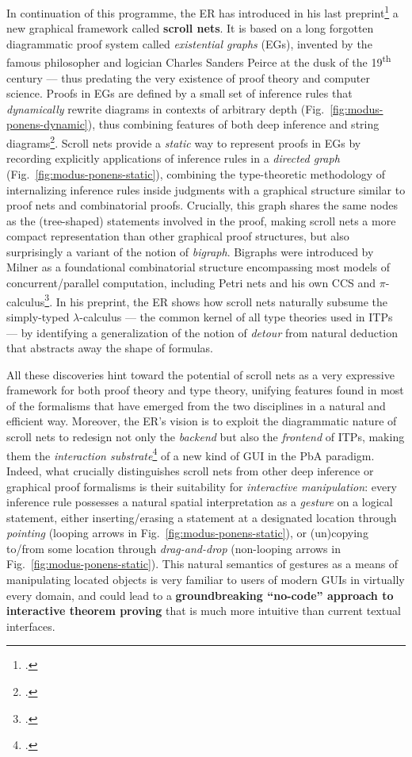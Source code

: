 \documentclass[12pt,draftproposal]{msca-pf}
\begin{document}
In continuation of this programme, the ER has introduced in his last
preprint\footcite{donatoScrollNets2025} a new graphical framework called \textbf{scroll nets}. It is
based on a long forgotten diagrammatic proof system called \emph{existential graphs} (EGs), invented
by the famous philosopher and logician Charles Sanders Peirce at the dusk of the
19\textsuperscript{th} century --- thus predating the very existence of proof theory and computer
science. Proofs in EGs are defined by a small set of inference rules that \emph{dynamically} rewrite
diagrams in contexts of arbitrary depth (Fig.~\ref{fig:modus-ponens-dynamic}), thus combining
features of both deep inference and string diagrams\footcite{bonchi_diagrammatic_2024}. Scroll nets
provide a \emph{static} way to represent proofs in EGs by recording explicitly applications of
inference rules in a \emph{directed graph} (Fig.~\ref{fig:modus-ponens-static}), combining the
type-theoretic methodology of internalizing inference rules inside judgments with a graphical
structure similar to proof nets and combinatorial proofs. Crucially, this graph shares the same
nodes as the (tree-shaped) statements involved in the proof, making scroll nets a more compact
representation than other graphical proof structures, but also surprisingly a variant of the notion
of \emph{bigraph}. Bigraphs were introduced by Milner as a foundational combinatorial structure
encompassing most models of concurrent/parallel computation, including Petri nets and his own CCS
and $\pi$-calculus\footcite{milnerBigraphicalReactiveSystems2001}. In his preprint, the ER shows how
scroll nets naturally subsume the simply-typed $\lambda$-calculus --- the common kernel of all type
theories used in ITPs --- by identifying a generalization of the notion of \emph{detour} from
natural deduction that abstracts away the shape of formulas.

All these discoveries hint toward the potential of scroll nets as a very expressive framework for
both proof theory and type theory, unifying features found in most of the formalisms that have
emerged from the two disciplines in a natural and efficient way. Moreover, the ER's vision is to
exploit the diagrammatic nature of scroll nets to redesign not only the \emph{backend} but also the
\emph{frontend} of ITPs, making them the \emph{interaction
substrate}\footcite{mackayInteractionSubstratesCombining2025} of a new kind of GUI in the PbA
paradigm. Indeed, what crucially distinguishes scroll nets from other deep inference or graphical
proof formalisms is their suitability for \emph{interactive manipulation}: every inference rule
possesses a natural spatial interpretation as a \emph{gesture} on a logical statement, either
inserting/erasing a statement at a designated location through \emph{pointing} (looping arrows in
Fig.~\ref{fig:modus-ponens-static}), or (un)copying to/from some location through
\emph{drag-and-drop} (non-looping arrows in Fig.~\ref{fig:modus-ponens-static}). This natural
semantics of gestures as a means of manipulating located objects is very familiar to users of modern
GUIs in virtually every domain, and could lead to a \textbf{groundbreaking ``no-code'' approach to
interactive theorem proving} that is much more intuitive than current textual interfaces.
\end{document}
